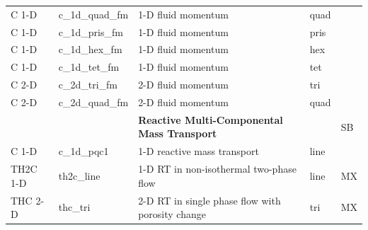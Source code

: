 \begin{center}
\begin{tabular*}{12.7cm}{|p{1.5cm}|p{1.8cm}|p{4.78cm}|p{1cm}|p{1.5cm}|}
C 1-D      & c\_1d\_quad\_fm  & 1-D fluid momentum & quad &  \\
C 1-D      & c\_1d\_pris\_fm  & 1-D fluid momentum & pris &  \\
C 1-D      & c\_1d\_hex\_fm   & 1-D fluid momentum & hex &  \\
C 1-D      & c\_1d\_tet\_fm   & 1-D fluid momentum & tet &  \\
C 2-D      & c\_2d\_tri\_fm   & 2-D fluid momentum & tri &  \\
C 2-D      & c\_2d\_quad\_fm  & 2-D fluid momentum & quad &  \\

\hline
           &             & \textbf{Reactive Multi-Componental Mass Transport} & & SB \\
C 1-D      & c\_1d\_pqc1  & 1-D reactive mass transport & line &  \\
\hline
TH2C 1-D    & th2c\_line   & 1-D RT in non-isothermal two-phase flow & line & MX  \\
THC 2-D    & thc\_tri   & 2-D RT in single phase flow with porosity change & tri & MX  \\
\hline
\end{tabular*}
\end{center}



